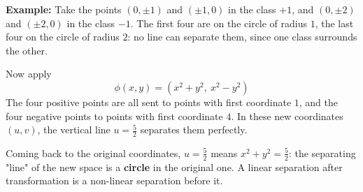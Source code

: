 \documentclass[]{article}
\begin{document}
	\noindent \textbf{Example:}
	Take the points $(0,\pm 1)$ and $(\pm 1, 0)$ in the class $+1$, and $(0,\pm 2)$ and $(\pm 2, 0)$ in the class $-1$.
	The first four are on the circle of radius $1$, the last four on the circle of radius $2$: no line can separate them, since one class surrounds the other.

	Now apply
	$$
	\phi(x,y) = \left( x^2 + y^2, \ x^2 - y^2 \right)
	$$
	The four positive points are all sent to points with first coordinate $1$, and the four negative points to points with first coordinate $4$.
	In these new coordinates $(u,v)$, the vertical line $u = \frac{5}{2}$ separates them perfectly.

	Coming back to the original coordinates, $u = \frac{5}{2}$ means $x^2 + y^2 = \frac{5}{2}$: the separating "line" of the new space is a \textbf{circle} in the original one.
	A linear separation after transformation is a non-linear separation before it.
\end{document}
